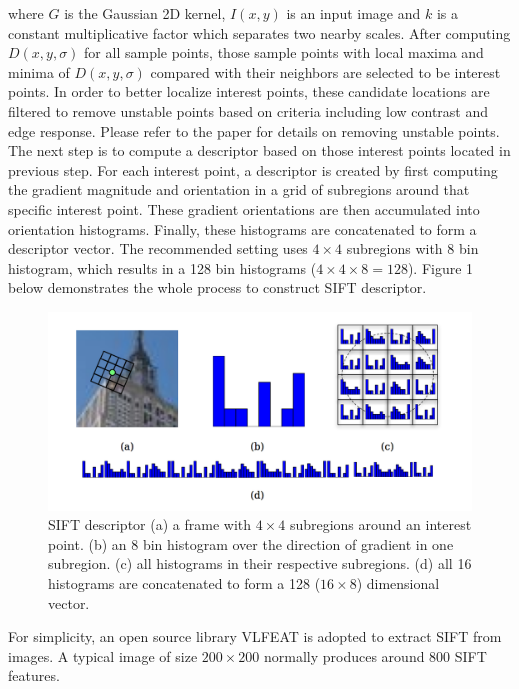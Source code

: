 \noindent where $G$ is the Gaussian 2D kernel, $I(x, y)$ is an input image and $k$ is a constant multiplicative factor which separates two nearby scales. After computing $D(x, y, \sigma)$ for all sample points, those sample points with local maxima and minima of $D(x, y, \sigma)$ compared with their neighbors are selected to be interest points. In order to better localize interest points, these candidate locations are filtered to remove unstable points based on criteria including low contrast and edge response. Please refer to the paper \cite{lowe2004distinctive} for details on removing unstable points. The next step is to compute a descriptor based on those interest points located in previous step. For each interest point, a descriptor is created by first computing the gradient magnitude and orientation in a grid of subregions around that specific interest point. These gradient orientations are then accumulated into orientation histograms. Finally, these histograms are concatenated to form a descriptor vector. The recommended setting uses $4 \times 4$ subregions with 8 bin histogram, which results in a 128 bin histograms ($4 \times 4 \times 8 = 128$). Figure 1 below demonstrates the whole process to construct SIFT descriptor. \\

\begin{figure}[!ht]
\centering
  \includegraphics[width=1\textwidth]{./SIFT_Descriptor.png}
\caption{SIFT descriptor \cite{solem2012programming} (a) a frame with $4 \times 4$ subregions around an interest point. (b) an 8 bin histogram over the direction of gradient in one subregion. (c) all histograms in their respective subregions. (d) all 16 histograms are concatenated to form a 128 ($16 \times 8$) dimensional vector.}
\end{figure}

\noindent For simplicity, an open source library VLFEAT \cite{vedaldi08vlfeat} is adopted to extract SIFT from images. A typical image of size $200 \times 200$ normally produces around 800 SIFT features.  

